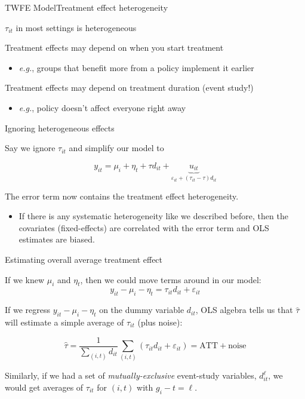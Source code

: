 \documentclass[t]{beamer}
\begin{document}
\begin{frame}{TWFE Model}{Treatment effect heterogeneity}
  \begin{center}
    $\tau_{it}$ in most settings is heterogeneous
  \end{center}
  
  \bigskip
  Treatment effects may depend on when you start treatment 
  \begin{itemize}
    \item \emph{e.g.}, groups that benefit more from a policy implement it earlier
  \end{itemize} 
  
  \bigskip
  Treatment effects may depend on treatment duration (event study!)
  \begin{itemize}
    \item \emph{e.g.}, policy doesn't affect everyone right away
  \end{itemize}
\end{frame}

\begin{frame}{Ignoring heterogeneous effects}

  Say we ignore $\tau_{it}$ and simplify our model to 

  $$
    y_{it} = \mu_i + \eta_t + \tau d_{it} + \underbrace{u_{it}}_{ \varepsilon_{it} + (\tau_{it} - \tau) d_{it} }
  $$

  The error term now contains the treatment effect heterogeneity. 
  \begin{itemize}
    \item If there is any systematic heterogeneity like we described before, then the covariates (fixed-effects) are correlated with the error term and OLS estimates are biased.
  \end{itemize}
\end{frame}

\begin{frame}{Estimating overall average treatment effect}

  If we knew $\mu_i$ and $\eta_t$, then we could move terms around in our model:
  $$
  y_{it} - \mu_i - \eta_t = \tau_{it} d_{it} + \varepsilon_{it}
  $$

  \bigskip
  If we regress $y_{it} - \mu_i - \eta_t$ on the dummy variable $d_{it}$, OLS algebra tells us that $\hat{\tau}$ will estimate a simple average of $\tau_{it}$ (plus noise):

  $$
    \hat{\tau} = \frac{1}{\sum_{(i,t)} d_{it}} \sum_{(i,t)} \left( \tau_{it} d_{it} + \varepsilon_{it} \right) = \text{ATT} + \text{noise}
  $$

  \pause
  \bigskip
  Similarly, if we had a set of \emph{mutually-exclusive} event-study variables, $d_{it}^\ell$, we would get averages of $\tau_{it}$ for $(i,t)$ with $g_i - t = \ell$. 
\end{frame}
\end{document}

